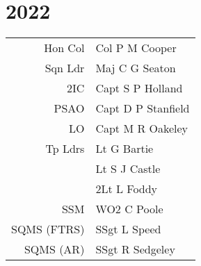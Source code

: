 \chapter*{2022}

\vspace*{10mm}

\begin{center}
  \small
  \begin{tabular}{rl}
    Hon Col & Col P M Cooper \\
    Sqn Ldr & Maj C G Seaton \\
    2IC & Capt S P Holland \\
    PSAO & Capt D P Stanfield \\
    LO & Capt M R Oakeley \\
    Tp Ldrs & Lt G Bartie \\
      & Lt S J Castle \\
      & 2Lt L Foddy \\
    SSM & WO2 C Poole \\
    SQMS (FTRS) & SSgt L Speed \\
    SQMS (AR) & SSgt R Sedgeley \\
  \end{tabular}
\end{center}

\vspace*{10mm}

